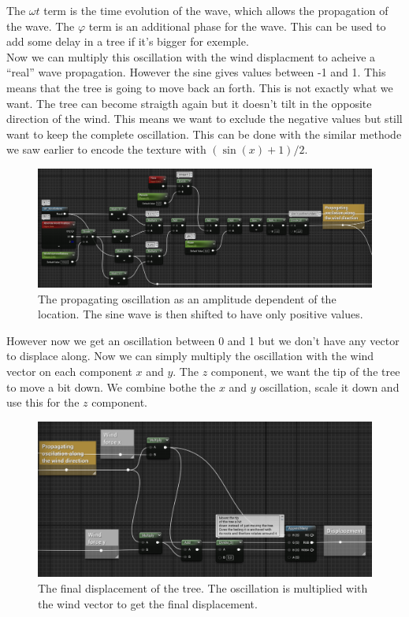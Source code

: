 \documentclass[../main.tex]{subfile}
\begin{document}
The $\omega t$ term is the time evolution of the wave, which allows the propagation of the wave. The $\varphi$ term is an additional phase for the wave. This can be used to add some
delay in a tree if it's bigger for exemple.\\

Now we can multiply this oscillation with the wind displacment to acheive a ``real'' wave propagation. However the sine gives values between -1 and 1. This means that the tree is going to
move back an forth. This is not exactly what we want. The tree can become straigth again but it doesn't tilt in the opposite direction of the wind. This means we want to exclude
the negative values but still want to keep the complete oscillation. This can be done with the similar methode we saw earlier to encode the texture with $(\sin(x)+1)/2$.\\
\begin{figure}[H]
    \centering
    \includegraphics[width=1\textwidth]{Ressources/PropagatingOscillation.png}
    \caption{The propagating oscillation as an amplitude dependent of the location. The sine wave is then shifted to have only positive values.}
\end{figure}

However now we get an oscillation between 0 and 1 but we don't have any vector to displace along. Now we can simply multiply the oscillation with the wind vector on each 
component $x$ and $y$. The $z$ component, we want the tip of the tree to move a bit down. We combine bothe the $x$ and $y$ oscillation, scale it down and use this for the $z$ component.\\
\begin{figure}[H]
    \centering
    \includegraphics[width=1\textwidth]{Ressources/OscillationCombineVectors.png}
    \caption{The final displacement of the tree. The oscillation is multiplied with the wind vector to get the final displacement.}
\end{figure}
\end{document}
